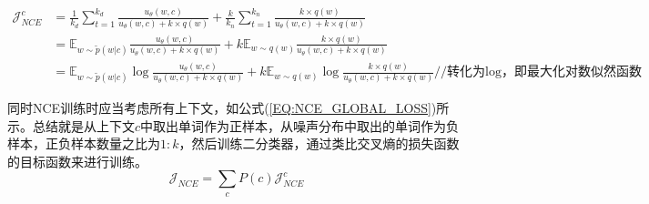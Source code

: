 \documentclass{article}
\begin{document}
\begin{equation}
    \begin{split}
        \mathcal{J}_{NCE}^{c} &= \frac{1}{k_d} \sum_{t=1}^{k_d} \frac{u_\theta (w,c)}{u_\theta (w,c) + k \times q(w)} + \frac{k}{k_n} \sum_{t=1}^{k_n} \frac{k \times q(w)}{u_\theta (w,c) + k \times q(w)} \\
        &= \mathbb{E}_{w \sim \tilde{p}(w|c)} \frac{u_\theta (w,c)}{u_\theta (w,c) + k \times q(w)} + k \mathbb{E}_{w \sim q(w)} \frac{k \times q(w)}{u_\theta (w,c) + k \times q(w)} \\
        &= \mathbb{E}_{w \sim \tilde{p}(w|c)} \log \frac{u_\theta (w,c)}{u_\theta (w,c) + k \times q(w)} + k \mathbb{E}_{w \sim q(w)} \log \frac{k \times q(w)}{u_\theta (w,c) + k \times q(w)} // \text{转化为log，即最大化对数似然函数}
    \end{split}
    \label{EQ:NCE_LOG_LOSS}
\end{equation}

同时NCE训练时应当考虑所有上下文，如公式(\ref{EQ:NCE_GLOBAL_LOSS})所示。总结就是从上下文$c$中取出单词作为正样本，从噪声分布中取出的单词作为负样本，正负样本数量之比为$1:k$，然后训练二分类器，通过类比交叉熵的损失函数的目标函数来进行训练。
\begin{equation}
    \mathcal{J}_{NCE} = \sum_{c} P(c)\mathcal{J}_{NCE}^c
    \label{EQ:NCE_GLOBAL_LOSS}
\end{equation}
\end{document}
